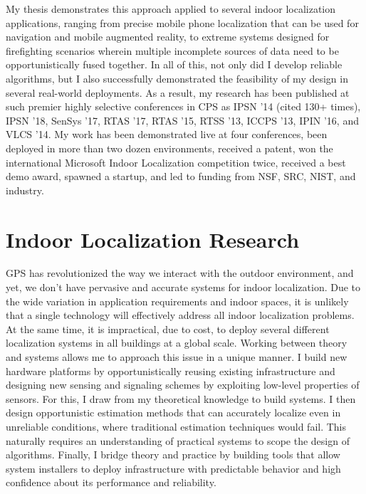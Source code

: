 \documentclass[10pt]{article}
\begin{document}
My thesis demonstrates this approach applied to several indoor localization applications, ranging from precise mobile phone localization that can be used for navigation and mobile augmented reality, to extreme systems designed for firefighting scenarios wherein multiple incomplete sources of data need to be opportunistically fused together. 
In all of this, not only did I develop reliable algorithms, but I also successfully demonstrated the feasibility of my design in several real-world deployments.
As a result, my research has been published at such premier highly selective conferences in CPS as IPSN '14 (cited 130+ times), IPSN '18, SenSys '17, RTAS '17, RTAS '15,  RTSS '13, ICCPS '13, IPIN '16, and VLCS '14. My work has been demonstrated live at four conferences, been deployed in more than two dozen environments, received a patent, won the international Microsoft Indoor Localization competition twice, received a best demo award, spawned a startup, and led to funding from NSF, SRC, NIST, and industry.



\section{Indoor Localization Research}

GPS has revolutionized the way we interact with the outdoor environment,  %
and yet, we don't have pervasive and accurate systems for indoor localization.  
Due to the wide variation in application requirements and indoor spaces, it is unlikely that a single technology will effectively address all indoor localization problems.  At the same time, it is impractical, due to cost, to deploy several different localization systems in all buildings at a global scale. %
Working between theory and systems allows me to approach this issue in a unique manner. I build new hardware platforms by opportunistically reusing existing infrastructure and designing new sensing and signaling schemes by exploiting low-level properties of sensors. For this, I draw from my theoretical knowledge to build systems. I then design opportunistic estimation methods that can accurately localize even in unreliable conditions, where traditional estimation techniques would fail. This naturally requires an understanding of practical systems to scope the design of algorithms. Finally, I bridge theory and practice by building tools that allow system installers to deploy infrastructure with predictable behavior and high confidence about its performance and reliability.  
\end{document}
